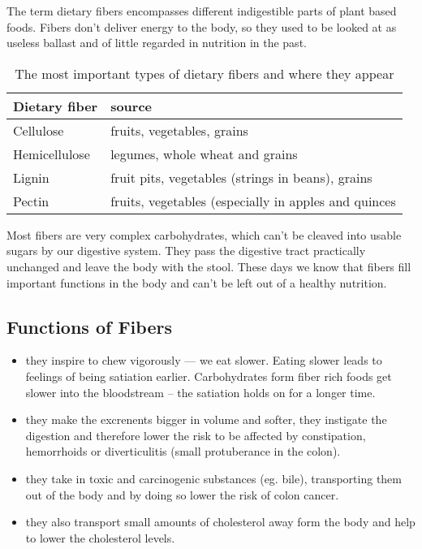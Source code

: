 \documentclass[../main.tex]{subfiles}
\begin{document}
The term dietary fibers\label{chap:fibers} encompasses different indigestible parts of plant based foods.
Fibers don't deliver energy to the body, so they used to be looked at as useless ballast and of little regarded in nutrition in the past.

\begin{table}[htb!]
  \centering
  \begin{tabular}{ll}
    \textbf{Dietary fiber} & \textbf{source} \\
    \hline
    Cellulose & fruits, vegetables, grains \\
    Hemicellulose & legumes, whole wheat and grains \\
    Lignin & fruit pits, vegetables (strings in beans), grains \\
    Pectin & fruits, vegetables (especially in apples and quinces \\
  \end{tabular}
  \caption[Dietary fibers]{The most important types of dietary fibers and where they appear}
\end{table}

Most fibers are very complex carbohydrates, which can't be cleaved into usable sugars by our digestive system.
They pass the digestive tract practically unchanged and leave the body with the stool.
These days we know that fibers fill important functions in the body and can't be left out of a healthy nutrition.

\subsection{Functions of Fibers}
\begin{itemize}
\item they inspire to chew vigorously --- we eat slower. Eating slower leads to feelings of being satiation earlier.
  Carbohydrates form fiber rich foods get slower into the bloodstream -- the satiation holds on for a longer time.
\item they make the excrenents bigger in volume and softer, they instigate the digestion and therefore lower the risk to be affected
  by constipation, hemorrhoids or diverticulitis (small protuberance in the colon).
\item they take in toxic and carcinogenic substances (eg. bile), transporting them out of the body and by doing so lower the risk of colon cancer.
  \item they also transport small amounts of cholesterol away form the body and help to lower the cholesterol levels.
  \end{itemize}
\end{document}
